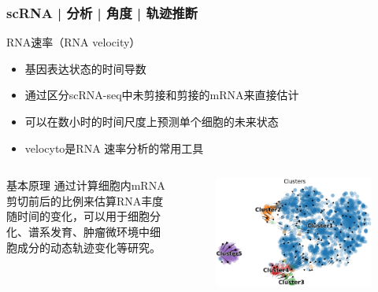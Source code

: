 \documentclass[11pt]{ctexbeamer}
\begin{document}
\begin{frame}
\begin{columns}
\begin{figure}
    	\end{figure}
    \end{columns}
\end{frame}

\begin{frame}
	\frametitle{scRNA | 分析 | 角度 | 轨迹推断}
	\begin{block}{RNA速率（RNA velocity）}
		\begin{itemize}
			\item 基因表达状态的时间导数
			\item 通过区分scRNA-seq中未剪接和剪接的mRNA来直接估计
			\item 可以在数小时的时间尺度上预测单个细胞的未来状态
			\item velocyto是RNA 速率分析的常用工具
		\end{itemize}
	\end{block}
\pause
         \begin{columns}
    	\begin{block}{基本原理}
           通过计算细胞内mRNA剪切前后的比例来估算RNA丰度随时间的变化，可以用于细胞分化、谱系发育、肿瘤微环境中细胞成分的动态轨迹变化等研究。
    	\end{block}
    	\begin{figure}
    		\includegraphics[width=\textwidth]{scRNA_velocity.png}
    	\end{figure}
    \end{columns}
\end{frame}
\end{document}
